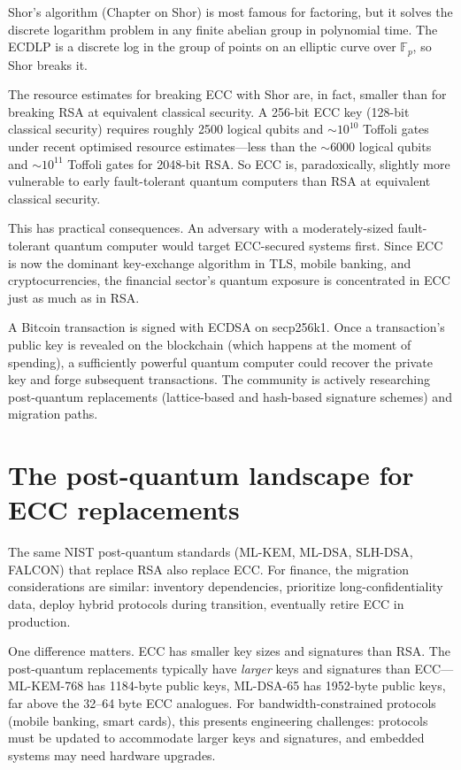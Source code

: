 Shor's algorithm (Chapter on Shor) is most famous for factoring, but it solves the discrete logarithm problem in any finite abelian group in polynomial time. The ECDLP is a discrete log in the group of points on an elliptic curve over $\mathbb{F}_p$, so Shor breaks it.

The resource estimates for breaking ECC with Shor are, in fact, smaller than for breaking RSA at equivalent classical security. A 256-bit ECC key (128-bit classical security) requires roughly 2500 logical qubits and $\sim 10^{10}$ Toffoli gates under recent optimised resource estimates---less than the $\sim 6000$ logical qubits and $\sim 10^{11}$ Toffoli gates for 2048-bit RSA. So ECC is, paradoxically, slightly more vulnerable to early fault-tolerant quantum computers than RSA at equivalent classical security.

This has practical consequences. An adversary with a moderately-sized fault-tolerant quantum computer would target ECC-secured systems first. Since ECC is now the dominant key-exchange algorithm in TLS, mobile banking, and cryptocurrencies, the financial sector's quantum exposure is concentrated in ECC just as much as in RSA.

\begin{example}
A Bitcoin transaction is signed with ECDSA on secp256k1. Once a transaction's public key is revealed on the blockchain (which happens at the moment of spending), a sufficiently powerful quantum computer could recover the private key and forge subsequent transactions. The community is actively researching post-quantum replacements (lattice-based and hash-based signature schemes) and migration paths.
\end{example}

\section{The post-quantum landscape for ECC replacements}

The same NIST post-quantum standards (ML-KEM, ML-DSA, SLH-DSA, FALCON) that replace RSA also replace ECC. For finance, the migration considerations are similar: inventory dependencies, prioritize long-confidentiality data, deploy hybrid protocols during transition, eventually retire ECC in production.

One difference matters. ECC has smaller key sizes and signatures than RSA. The post-quantum replacements typically have \emph{larger} keys and signatures than ECC---ML-KEM-768 has 1184-byte public keys, ML-DSA-65 has 1952-byte public keys, far above the 32--64 byte ECC analogues. For bandwidth-constrained protocols (mobile banking, smart cards), this presents engineering challenges: protocols must be updated to accommodate larger keys and signatures, and embedded systems may need hardware upgrades.

